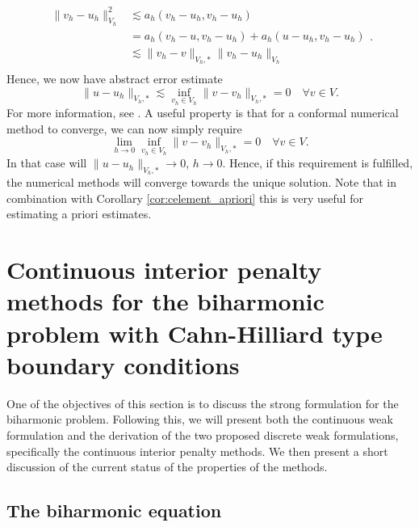 \documentclass[11pt]{article}
\theoremstyle{remark}
\numberwithin{equation}{section}
\begin{document}
\begin{equation}
\label{eq:cealemma_proof}
    \begin{split}
 \| v_{h} -u_{h} \|_{ V_{h}  }^{ 2 } & \lesssim   a_{h}( v_{h} - u_{h}, v_{h} - u_{h} )    \\
 &= a_{h}( v_{h} - u, v_{h}- u_{h}) + a_{h}( u - u_{h}, v_{h} - u_{h})   \\
 & \lesssim \| v_{h}- v \|_{ V_{h},* }^{  } \| v_{h}- u_{h} \|_{V_{h} }^{  }   \\
    \end{split}
.\end{equation}
Hence, we now have abstract error estimate
\begin{equation}
\| u - u_{h} \|_{ V_{h},*  }^{  }  \lesssim  \inf_{v_{h} \in  V_{h}}  \| v - v_{h} \|_{ V_{h},*  }^{  } = 0 \quad  \forall v \in V.
\end{equation}
For more information, see \cite[Theorem 1.35]{pietro2012}.
A useful property is that for a conformal numerical method to converge, we can now simply require
\begin{equation}
\lim_{h \to 0}  \inf_{v_{h} \in  V_{h}}  \| v - v_{h} \|_{ V_{h},*  }^{  } = 0 \quad  \forall v \in V.
\end{equation}
In that case will $\| u - u_{h} \|_{ V_{h},*  }^{  }  \to  0$, $h \to  0$. Hence, if this requirement is fulfilled, the numerical methods will converge towards the unique solution.
Note that in combination with Corollary \ref{cor:celement_apriori} this is very useful for estimating a priori estimates.


\section{Continuous interior penalty methods for the biharmonic problem with Cahn-Hilliard type boundary conditions}%
\label{sec:CIP_biharmonic_problem}

One of the objectives of this section is to discuss the strong formulation for the biharmonic problem.
Following this, we will present both the continuous weak formulation and the derivation of the two proposed discrete weak formulations, specifically the continuous interior penalty methods.
We then present a short discussion of the current status of the properties of the methods.

\subsection{The biharmonic equation}
\label{sub:the_biharmonic_problem_with_c_h_boundary_conditions}
\end{document}
